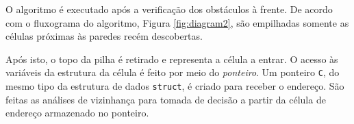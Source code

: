 O algoritmo é executado após a verificação dos obstáculos à frente. De acordo com o fluxograma do algoritmo, Figura \ref{fig:diagram2}, são empilhadas somente as células próximas às paredes recém descobertas. 

%
%  
%   
%    

Após isto, o topo da pilha é retirado e representa a célula a entrar. O acesso às variáveis da estrutura da célula é feito por meio do \emph{ponteiro}. Um ponteiro \verb+C+, do mesmo tipo da estrutura de dados \verb+struct+, é criado para receber o endereço. São feitas as análises de vizinhança para tomada de decisão a partir da célula de endereço armazenado no ponteiro.
%
%
%   

